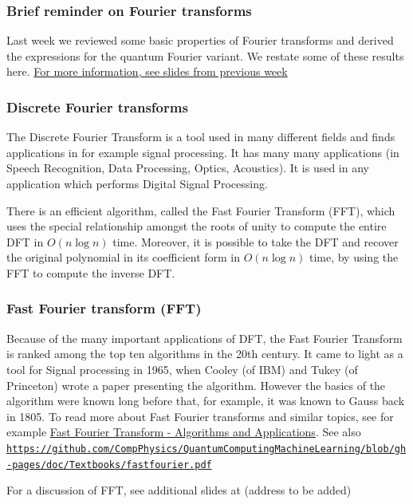 \documentclass{beamer}
\begin{document}
\begin{frame}
\frametitle{Brief reminder on Fourier transforms}

Last week we reviewed some basic properties of Fourier transforms and derived the expressions for the quantum Fourier variant.
We restate some of these results here.
\href{{https://github.com/CompPhysics/QuantumComputingMachineLearning/blob/gh-pages/doc/pub/week10/ipynb/week10.ipynb}}{For more information, see slides from previous week}
\end{frame}

\begin{frame}
\frametitle{Discrete Fourier transforms}

The Discrete Fourier Transform is a tool used in many different fields
and finds applications in for example signal processing.  It has many
many applications (in Speech Recognition, Data Processing, Optics,
Acoustics). It is used in any application which performs Digital
Signal Processing.

There
is an efficient algorithm, called the Fast Fourier Transform (FFT),
which uses the special relationship amongst the roots of unity to
compute the entire DFT in $O(n \log{n})$ time. Moreover, it is possible to take the DFT and recover the original
polynomial in its coefficient form in $O(n \log{n})$ time, by using the
FFT to compute the inverse DFT.
\end{frame}

\begin{frame}
\frametitle{Fast Fourier transform (FFT)}

Because of the many important applications of DFT, the Fast Fourier
Transform is ranked among the top ten  algorithms in the 20th century.
It came to light as a tool for Signal processing in 1965, when
Cooley (of IBM) and Tukey (of Princeton) wrote a paper presenting the
algorithm. However the basics of the algorithm were known long before
that, for example, it was known to Gauss back in 1805.
To read more about Fast Fourier transforms and similar topics, see for example \href{{https://link.springer.com/book/10.1007/978-1-4020-6629-0}}{Fast Fourier Transform - Algorithms and Applications}. See also \href{{https://github.com/CompPhysics/QuantumComputingMachineLearning/blob/gh-pages/doc/Textbooks/fastfourier.pdf}}{\nolinkurl{https://github.com/CompPhysics/QuantumComputingMachineLearning/blob/gh-pages/doc/Textbooks/fastfourier.pdf}}

For a discussion of FFT, see additional slides at (address to be added)
\end{frame}
\end{document}
